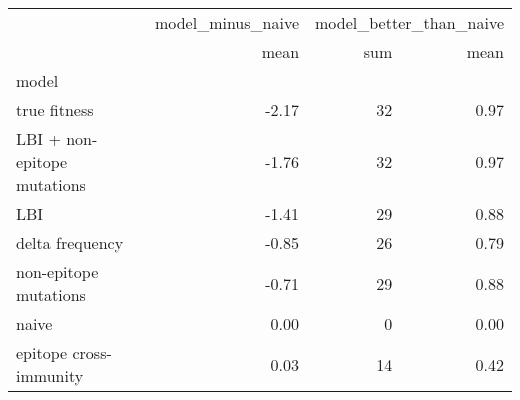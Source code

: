 \begin{tabular}{lrrr}
\toprule
{} & model\_minus\_naive & \multicolumn{2}{l}{model\_better\_than\_naive} \\
{} &              mean &                     sum & mean \\
model                       &                   &                         &      \\
\midrule
true fitness                &             -2.17 &                      32 & 0.97 \\
LBI + non-epitope mutations &             -1.76 &                      32 & 0.97 \\
LBI                         &             -1.41 &                      29 & 0.88 \\
delta frequency             &             -0.85 &                      26 & 0.79 \\
non-epitope mutations       &             -0.71 &                      29 & 0.88 \\
naive                       &              0.00 &                       0 & 0.00 \\
epitope cross-immunity      &              0.03 &                      14 & 0.42 \\
\bottomrule
\end{tabular}

